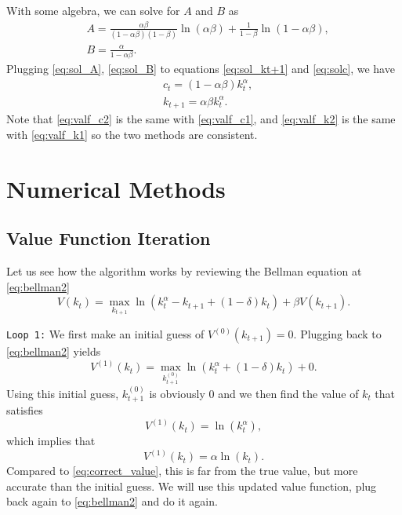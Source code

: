 \documentclass[10pt,a4paper]{article}
\begin{document}
With some algebra, we can solve for $A$ and $B$ as
\begin{align}
& \label{eq:sol_A} A = \frac{\alpha\beta}{(1-\alpha\beta)(1-\beta)}\ln(\alpha\beta) + \frac{1}{1-\beta}\ln(1-\alpha\beta), \\
& \label{eq:sol_B} B = \frac{\alpha}{1-\alpha\beta}.
\end{align}
Plugging \eqref{eq:sol_A}, \eqref{eq:sol_B} to equations \eqref{eq:sol_kt+1} and \eqref{eq:solc}, we have
\begin{align}
& \label{eq:valf_c2} c_t = (1-\alpha\beta)k_t^\alpha, \\
& \label{eq:valf_k2} k_{t+1} = \alpha \beta k_t^\alpha.
\end{align}
Note that \eqref{eq:valf_c2} is the same with \eqref{eq:valf_c1}, and \eqref{eq:valf_k2} is the same with \eqref{eq:valf_k1} so the two methods are consistent.

\section{Numerical Methods}

\subsection{Value Function Iteration}
Let us see how the algorithm works by reviewing the Bellman equation at \eqref{eq:bellman2}
\begin{equation*}
	V(k_t) = \max_{k_{t+1}} \ln(k_t^\alpha - k_{t+1} + (1-\delta)k_t) + \beta V(k_{t+1}). \tag{5}
\end{equation*}

\verb|Loop 1:| We first make an initial guess of $V^{(0)}(k_{t+1}) = 0$. Plugging back to \eqref{eq:bellman2} yields
\begin{equation*}
	V^{(1)}(k_t) = \max_{k^{(0)}_{t+1}} \ln(k_t^\alpha + (1-\delta) k_t) + 0.
\end{equation*}
Using this initial guess, $k^{(0)}_{t+1}$ is obviously 0 and we then find the value of $k_t$ that satisfies
\begin{equation*}
	V^{(1)}(k_t) = \ln(k_t^\alpha),
\end{equation*}
which implies that
\begin{equation*}
	V^{(1)} (k_t) = \alpha \ln(k_t).
\end{equation*}
Compared to \eqref{eq:correct_value}, this is far from the true value, but more accurate than the initial guess. We will use this updated value function, plug back again to \eqref{eq:bellman2} and do it again. 
\end{document}
